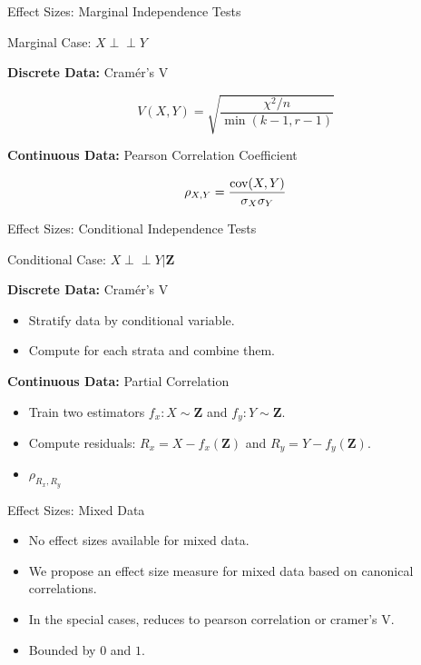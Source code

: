 \documentclass{beamer}
\def\ci{\perp\!\!\!\!\!\perp}
\begin{document}
\begin{frame}{Effect Sizes: Marginal Independence Tests}
	\centerline{Marginal Case: $ X \ci Y $}

	\vspace{2em}
	
	\textbf{Discrete Data:} Cram\'er's V
		
		$$ V(X, Y) = \sqrt{\frac{\chi^2 / n }{\min(k-1, r-1)}} $$
	
	\vspace{2em}

	\textbf{Continuous Data:} Pearson Correlation Coefficient

		$$ \rho_{X,Y} = \frac{\textnormal{cov}(X, Y)}{\sigma_X \sigma_Y} $$
	

		
\end{frame}

\begin{frame}{Effect Sizes: Conditional Independence Tests}
	\centerline{Conditional Case: $ X \ci Y \rvert \bm{Z} $}

	\vspace{2em}

	\textbf{Discrete Data:} Cram\'er's V
		\begin{itemize}
			\item Stratify data by conditional variable.
			\item Compute for each strata and combine them.
		\end{itemize}
	
	\vspace{2em}
				
	\textbf{Continuous Data:} Partial Correlation
		\begin{itemize}
			\item Train two estimators $ f_x: X \sim \bm{Z} $ and $ f_y: Y \sim \bm{Z} $.
			\item Compute residuals: $ R_x = X - f_x(\bm{Z}) $ and $ R_y = Y - f_y(\bm{Z}) $.
			\item $ \rho_{R_x, R_y} $
		\end{itemize}

\end{frame}

\begin{frame}{Effect Sizes: Mixed Data}
	\begin{itemize}
		\item No effect sizes available for mixed data.
		\item We propose an effect size measure for mixed data based on canonical correlations.
		\item In the special cases, reduces to pearson correlation or cramer's V.
		\item Bounded by $ 0 $ and $ 1 $.
	\end{itemize}
\end{frame}
\end{document}
